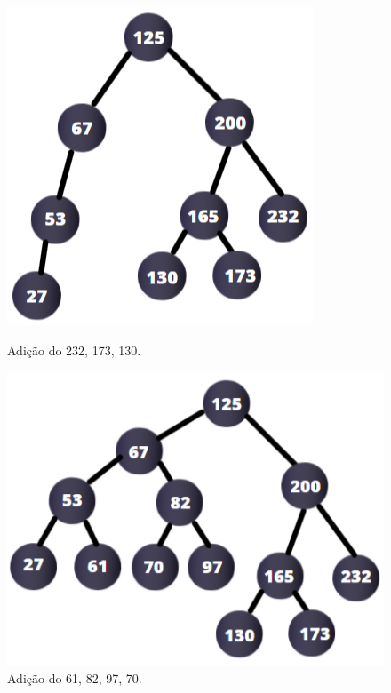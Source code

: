 \documentclass[11pt]{article} %
\begin{document}
\begin{enumerate}[a)]
\begin{figure}
    \centering
    \begin{minipage}{0.45\textwidth}
        \centering
        \includegraphics[scale = 0.565]{codigobin3.png}
        \caption{Adição do 232, 173, 130.}
    \end{minipage}\hfill
    \begin{minipage}{0.45\textwidth}
        \centering
        \includegraphics[scale = 0.565]{codigobin4.png}
        \caption{Adição do 61, 82, 97, 70.}
    \end{minipage}
\end{figure}

\newpage


\end{enumerate}
\end{document}
